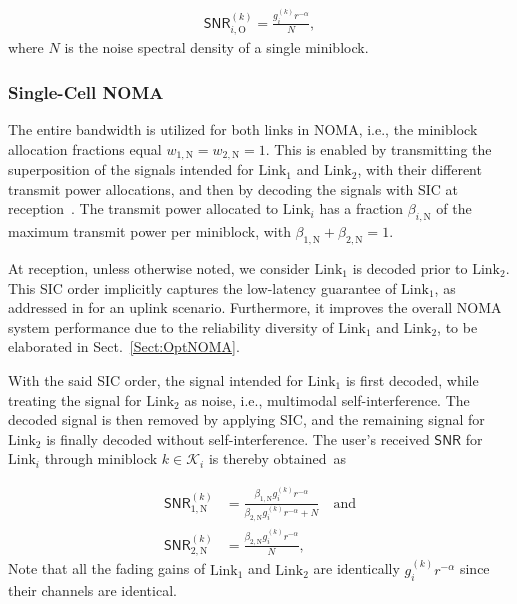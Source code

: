 \documentclass[conference]{IEEEtran}
\def\SNR{\mathsf{SNR}}
\def\OMA{\text{O}}
\def\NOMA{\text{N}}
\def\L{\text{Link}}
\begin{document}
\vspace{-10pt}\small\begin{align}
\SNR_{i,\OMA}^{(k)} = \frac{ g_{i}^{(k)} r^{-\alpha}}{ N},\label{Eq:SNR_OMA}
\end{align}\normalsize
where $N$ is the noise spectral density of a single miniblock.




\subsubsection{Single-Cell NOMA} \label{Sect:Sys_NOMA}
The entire bandwidth is utilized for both links in NOMA, i.e., the miniblock allocation fractions equal $w_{1,\NOMA}=w_{2,\NOMA}=1$. This is enabled by transmitting the superposition of the signals intended for $\L_1$ and $\L_2$, with their different transmit power allocations, and then by decoding the signals with SIC at reception~\cite{3GPPMUST:2015}. The transmit power allocated to $\L_i$ has a fraction $\beta_{i,\NOMA}$ of the maximum transmit power per miniblock, with $\beta_{1,\NOMA}+\beta_{2,\NOMA}=1$.

At reception, unless otherwise noted, we consider $\L_1$ is decoded prior to $\L_2$. This SIC order implicitly captures the low-latency guarantee of $\L_1$, as addressed in \cite{Petar5G:18} for an uplink scenario. Furthermore, it improves the overall NOMA system performance due to the reliability diversity of $\L_1$ and $\L_2$, to be elaborated in Sect.~\ref{Sect:OptNOMA}.

With the said SIC order, the signal intended for $\L_1$ is first decoded, while treating the signal for $\L_2$ as noise, i.e., multimodal self-interference. The decoded signal is then removed by applying SIC, and the remaining signal for $\L_2$ is finally decoded without self-interference. The user's received $\SNR$ for $\L_i$ through miniblock $k\in\mathcal{K}_i$ is thereby obtained~as

\vspace{-10pt}\small\begin{align}
\SNR_{1,\NOMA}^{(k)} &= \frac{\beta_{1,\NOMA}   g_{i}^{(k)} r^{-\alpha}}{\beta_{2,\NOMA}  g_{i}^{(k)} r^{-\alpha} + N} \quad\text{and}\label{Eq:SNR1_NOMA}\\ 
\SNR_{2,\NOMA}^{(k)} &= \frac{\beta_{2,\NOMA}   g_{i}^{(k)} r^{-\alpha}}{N}, \label{Eq:SNR2_NOMA}
\end{align}\normalsize
Note that all the fading gains of $\L_1$ and $\L_2$ are identically $g_{i}^{(k)} r^{-\alpha}$ since their channels are identical.
\end{document}
